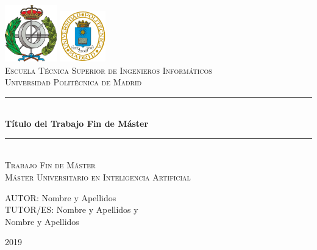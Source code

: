 \begin{titlepage}

\newcommand{\HRule}{\rule{\linewidth}{0.5mm}} %

\center %
 
\includegraphics[width=2.25cm]{recursos/FACINFO}
  \hspace{8cm}
\includegraphics[width=2cm]{recursos/logoupm.png}
\\[1cm]

\textsc{\Large Escuela Técnica Superior de Ingenieros Informáticos}\\[0.5cm]
\textsc{\large Universidad Politécnica de Madrid}
\\[3cm]


 \HRule \\[0.4cm]
{ \huge \bfseries Título del Trabajo Fin de Máster}\\[0.4cm] %
\HRule \\[2.5cm]

\textsc{\LARGE Trabajo Fin de Máster}\\[0.5cm] 
\textsc{\Large Máster Universitario en Inteligencia Artificial }\\[2.5cm]

\begin{flushright}
\large
AUTOR: Nombre y Apellidos\\ %
TUTOR/ES: Nombre y Apellidos y\\Nombre y Apellidos%
\end{flushright}

\vspace{1.3cm}

{ {2019}}\\[3cm] %

\vfill %

\end{titlepage}